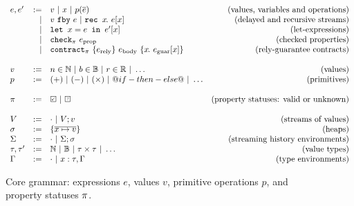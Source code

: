 
\begin{figure}
  \[
  \begin{array}{lrlr}
    e, e' & := & v ~|~ x ~|~ p(\ov{e}) & \mbox{(values, variables and operations)} \\
          & | & \xfby{v}{e} ~|~ \xrec{x}{e[x]} & \mbox{(delayed and recursive streams)} \\ %
          & | & \xlet{x}{e}{e'[x]} & \mbox{(let-expressions)}\\
          & | & \xcheckP{\PStatus}{e_{\text{prop}}} & \mbox{(checked properties)} \\
          & | & \xcontractP{\PStatus}{\erely}{\ebody}{\rawbind{x}{\eguar[x]}} & \mbox{(rely-guarantee contracts)} \\
    \\
    v & := & n \in \mathbb{N} ~|~ b \in \mathbb{B} ~|~ r \in \mathbb{R} ~|~ \hdots  & \mbox{(values)} \\
    p & := & (+) ~|~ (-) ~|~ (\times) ~|~ @if-then-else@ ~|~ \hdots & \mbox{(primitives)} \\
    \\
    \PStatus & := & \PSValid ~|~ \PSUnknown & \mbox{(property statuses: valid or unknown)}\\
    \\
    V & := & \cdot ~|~ V;v & \mbox{(streams of values)} \\
    \sigma & := & \sgl{\ov{x \mapsto v}} & \mbox{(heaps)} \\
    \Sigma & := & \cdot ~|~ \Sigma;\sigma & \mbox{(streaming history environments)} \\
    \tau, \tau' & := & \mathbb{N} ~|~ \mathbb{B} ~|~ \tau \times \tau ~|~ \hdots & \mbox{(value types)} \\
    \Gamma & := & \cdot ~|~ x : \tau, \Gamma & \mbox{(type environments)}  \\
    \end{array}
  \]
  \caption{Core grammar: expressions $e$, values $v$, primitive operations $p$, and property statuses $\pi$.}
  \label{f:core-grammar}
\end{figure}